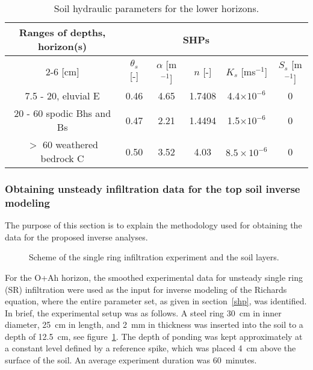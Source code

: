 \documentclass[review]{myarticle}
\begin{document}
\begin{table}[ht]
\begin{center}
\caption{Soil hydraulic parameters for the lower horizons.}
\begin{small}
\doublespacing
\begin{tabular}{c c c c c c}
\toprule
Ranges of depths, horizon(s)&\multicolumn{4}{c}{SHPs}\\ \cline{2-6}
[cm]&$\theta_s$ [-] & $\alpha$ [m$^{-1}$]& $n$ [-]& $K_s$ [ms$^{-1}$] & $S_s$ [m$^{-1}$] \\ \hline
7.5 - 20, eluvial E&0.46&4.65&1.7408&4.4$\times 10^{-6}$ & 0\\
20 - 60 spodic Bhs and Bs&0.47&2.21&1.4494&1.5$\times 10^{-6}$ & 0\\
$>$ 60 weathered bedrock C & 0.50 & 3.52 & 4.03 &  $8.5\times 10^{-6}$ & 0 \\
\toprule
\end{tabular}
\end{small}
\label{tab_SHP}
\end{center}
\end{table}


\subsubsection{Obtaining unsteady infiltration data for the top soil inverse modeling}

The purpose of this section is to explain the methodology used for obtaining the data for the proposed inverse analyses. 


 \begin{figure}
\centering
{}
 \caption{Scheme of the single ring infiltration experiment and the soil layers. }
 \label{experiment}
\end{figure}


For the O+Ah horizon, the smoothed experimental data for unsteady single ring (SR) infiltration were used as the input for inverse modeling of the Richards equation, where the entire parameter set, as given in section~\ref{shp}, was identified. 
In brief, the experimental setup was as follows. A steel ring 30~cm in inner diameter, 25~cm in length, and 2~mm in thickness was inserted into the soil to a depth of 12.5~cm, see figure~\ref{experiment}. The depth of ponding was kept approximately at a constant level defined by a reference spike, which was placed 4~cm above the surface of the soil.  An average experiment duration was 60~minutes.
\end{document}
